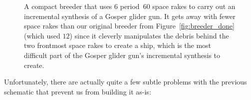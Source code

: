 \begin{figure}[!htb]
	\centering
	\caption{A compact breeder that uses $6$ period~$60$ space rakes to carry out an incremental synthesis of a Gosper glider gun. It gets away with fewer space rakes than our original breeder from Figure~\ref{fig:breeder_done} (which used $12$) since it cleverly manipulates the debris behind the two frontmost space rakes to create a ship, which is the most difficult part of the Gosper glider gun's incremental synthesis to create.}
	\label{fig:breeder_compact}
\end{figure}

Unfortunately, there are actually quite a few subtle problems with the previous schematic that prevent us from building it as-is:\smallskip

